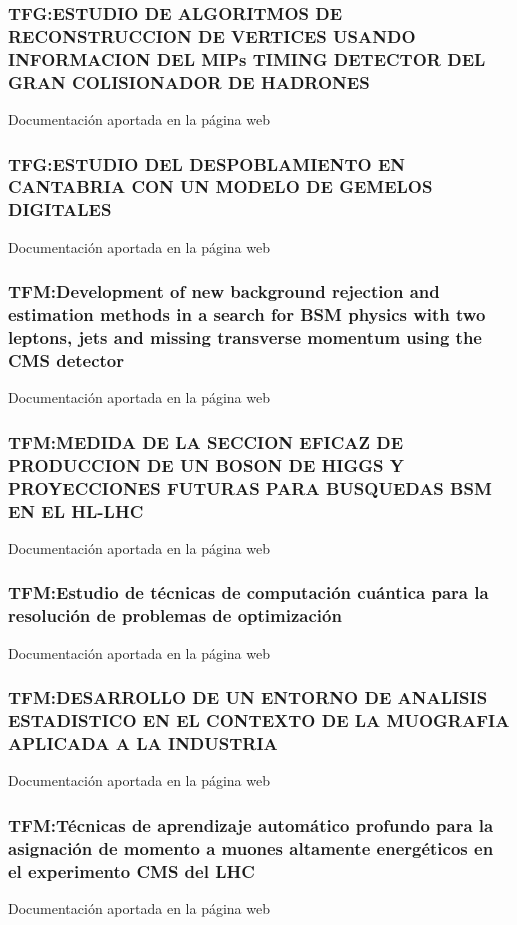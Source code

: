 \documentclass[a4paper, 11pt, twoside, openright]{report}
\begin{document}
\subsubsection{TFG:ESTUDIO DE ALGORITMOS DE RECONSTRUCCION DE VERTICES USANDO INFORMACION DEL MIPs TIMING DETECTOR DEL GRAN COLISIONADOR DE HADRONES}
Documentación aportada en la página web

\subsubsection{TFG:ESTUDIO DEL DESPOBLAMIENTO EN CANTABRIA CON UN MODELO DE GEMELOS DIGITALES}
Documentación aportada en la página web

\subsubsection{TFM:Development of new background rejection and estimation methods in a search for BSM physics with two leptons, jets and missing transverse momentum using the CMS detector}
Documentación aportada en la página web

\subsubsection{TFM:MEDIDA DE LA SECCION EFICAZ DE PRODUCCION DE UN BOSON DE HIGGS Y PROYECCIONES FUTURAS PARA BUSQUEDAS BSM EN EL HL-LHC}
Documentación aportada en la página web

\subsubsection{TFM:Estudio de técnicas de computación cuántica para la resolución de problemas de optimización}
Documentación aportada en la página web

\subsubsection{TFM:DESARROLLO DE UN ENTORNO DE ANALISIS ESTADISTICO EN EL CONTEXTO DE LA MUOGRAFIA APLICADA A LA INDUSTRIA}
Documentación aportada en la página web

\subsubsection{TFM:Técnicas de aprendizaje automático profundo para la asignación de momento a muones altamente energéticos en el experimento CMS del LHC}
Documentación aportada en la página web
\end{document}

